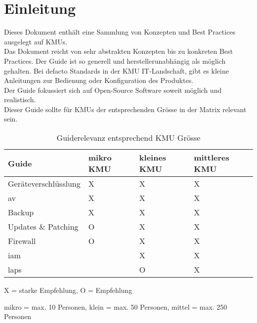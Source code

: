 \chapter{Einleitung}
Dieses Dokument enthält eine Sammlung von Konzepten und Best Practices ausgelegt auf KMUs.\\

Das Dokument reicht von sehr abstrakten Konzepten bis zu konkreten Best Practices.
Der Guide ist so generell und herstellerunabhängig als möglich gehalten.
Bei defacto Standards in der KMU IT-Landschaft, gibt es kleine Anleitungen zur Bedienung oder Konfiguration des Produktes.\\

Der Guide fokussiert sich auf Open-Source Software soweit möglich und realistisch.\\

Dieser Guide sollte für KMUs der entsprechenden Grösse in der Matrix relevant sein.

\begin{table}[H]
    \begin{center}
        \begin{tabular}{l|l|l|l}
            Guide                & mikro KMU & kleines KMU & mittleres KMU\\
            \hline
            Geräteverschlüsslung & X         & X             & X\\
            \acrlong{av}         & X         & X             & X\\
            Backup               & X         & X             & X\\
            Updates \& Patching  & O         & X             & X\\
            Firewall             & O         & X             & X\\
            \acrshort{iam}       &           & X             & X\\
            \acrshort{laps}      &           & O             & X\\
        \end{tabular}
        \caption*{X = starke Empfehlung, O = Empfehlung}
        \vspace{-3mm}
        \caption*{mikro = max. 10 Personen, klein = max. 50 Personen, mittel = max. 250 Personen}
    \end{center}
    \caption{Guiderelevanz entsprechend KMU Grösse}
\end{table}